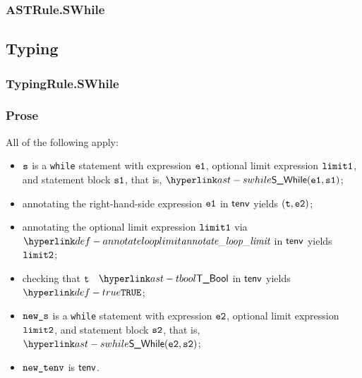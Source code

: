\subsubsection{ASTRule.SWhile}
\begin{mathpar}
\end{mathpar}

\begin{mathpar}
\end{mathpar}

\subsection{Typing}
\subsubsection{TypingRule.SWhile \label{sec:TypingRule.SWhile}}
\subsubsection{Prose}
All of the following apply:
\begin{itemize}
\item $\vs$ is a \texttt{while} statement with expression $\veone$, optional limit expression $\vlimitone$,
      and statement block $\vsone$, that is, $\SWhile(\veone, \vsone)$;
\item annotating the right-hand-side expression $\veone$ in $\tenv$ yields $(\vt, \vetwo)$\ProseOrTypeError;
\item annotating the optional limit expression $\vlimitone$ via $\annotatelooplimit$ in $\tenv$ yields $\vlimittwo$\ProseOrTypeError;
\item checking that $\vt$ \typesatisfies\ $\TBool$ in $\tenv$ yields $\True$\ProseOrTypeError;
\item $\news$ is a \texttt{while} statement with expression $\vetwo$, optional limit expression $\vlimittwo$,
      and statement block $\vstwo$, that is, $\SWhile(\vetwo, \vstwo)$;
\item $\newtenv$ is $\tenv$.
\end{itemize}
